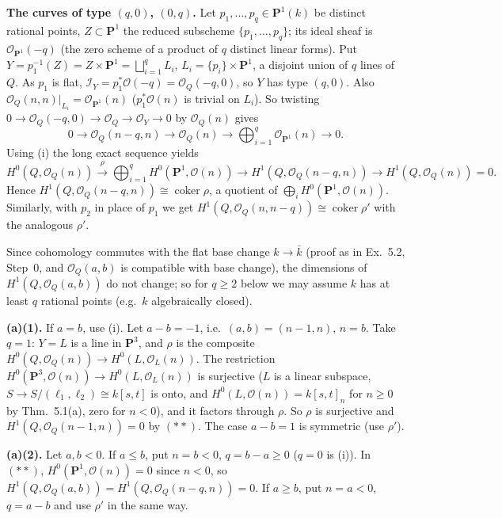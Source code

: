 \documentclass[11pt]{article}
\begin{document}
\textbf{The curves of type $(q,0)$, $(0,q)$.} Let $p_1,\dots,p_q\in\mathbf P^1(k)$ be distinct rational points, $Z\subset\mathbf P^1$ the reduced subscheme $\{p_1,\dots,p_q\}$; its ideal sheaf is $\mathcal O_{\mathbf P^1}(-q)$ (the zero scheme of a product of $q$ distinct linear forms). Put $Y=p_1^{-1}(Z)=Z\times\mathbf P^1=\bigsqcup_{i=1}^qL_i$, $L_i=\{p_i\}\times\mathbf P^1$, a disjoint union of $q$ lines of $Q$. As $p_1$ is flat, $\mathcal I_Y=p_1^*\mathcal O(-q)=\mathcal O_Q(-q,0)$, so $Y$ has type $(q,0)$. Also $\mathcal O_Q(n,n)|_{L_i}=\mathcal O_{\mathbf P^1}(n)$ ($p_1^*\mathcal O(n)$ is trivial on $L_i$). So twisting $0\to\mathcal O_Q(-q,0)\to\mathcal O_Q\to\mathcal O_Y\to0$ by $\mathcal O_Q(n)$ gives
\[
0\to\mathcal O_Q(n-q,n)\to\mathcal O_Q(n)\to\bigoplus_{i=1}^q\mathcal O_{\mathbf P^1}(n)\to0.
\]
Using (i) the long exact sequence yields
\[
H^0(Q,\mathcal O_Q(n))\xrightarrow{\ \rho\ }\bigoplus_{i=1}^qH^0(\mathbf P^1,\mathcal O(n))\to H^1(Q,\mathcal O_Q(n-q,n))\to H^1(Q,\mathcal O_Q(n))=0.\tag{$**$}
\]
Hence $H^1(Q,\mathcal O_Q(n-q,n))\cong\operatorname{coker}\rho$, a quotient of $\bigoplus_iH^0(\mathbf P^1,\mathcal O(n))$. Similarly, with $p_2$ in place of $p_1$ we get $H^1(Q,\mathcal O_Q(n,n-q))\cong\operatorname{coker}\rho'$ with the analogous $\rho'$.

Since cohomology commutes with the flat base change $k\to\bar k$ (proof as in Ex.~5.2, Step~0, and $\mathcal O_Q(a,b)$ is compatible with base change), the dimensions of $H^1(Q,\mathcal O_Q(a,b))$ do not change; so for $q\ge2$ below we may assume $k$ has at least $q$ rational points (e.g.\ $k$ algebraically closed).

\textbf{(a)(1).} If $a=b$, use (i). Let $a-b=-1$, i.e.\ $(a,b)=(n-1,n)$, $n=b$. Take $q=1$: $Y=L$ is a line in $\mathbf P^3$, and $\rho$ is the composite $H^0(Q,\mathcal O_Q(n))\to H^0(L,\mathcal O_L(n))$. The restriction $H^0(\mathbf P^3,\mathcal O(n))\to H^0(L,\mathcal O_L(n))$ is surjective ($L$ is a linear subspace, $S\to S/(\ell_1,\ell_2)\cong k[s,t]$ is onto, and $H^0(L,\mathcal O(n))=k[s,t]_n$ for $n\ge0$ by Thm.~5.1(a), zero for $n<0$), and it factors through $\rho$. So $\rho$ is surjective and $H^1(Q,\mathcal O_Q(n-1,n))=0$ by $(**)$. The case $a-b=1$ is symmetric (use $\rho'$).

\textbf{(a)(2).} Let $a,b<0$. If $a\le b$, put $n=b<0$, $q=b-a\ge0$ ($q=0$ is (i)). In $(**)$, $H^0(\mathbf P^1,\mathcal O(n))=0$ since $n<0$, so $H^1(Q,\mathcal O_Q(a,b))=H^1(Q,\mathcal O_Q(n-q,n))=0$. If $a\ge b$, put $n=a<0$, $q=a-b$ and use $\rho'$ in the same way.
\end{document}
